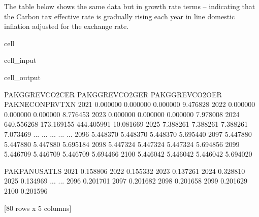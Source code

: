 \documentclass[letterpaper,10pt,english]{jupyterBook}
\begin{document}
\sphinxAtStartPar
The table below shows the same data but in growth rate terms – indicating that the Carbon tax effective rate is gradually rising each year in line domestic inflation adjusted for the exchange rate.

\begin{sphinxuseclass}{cell}\begin{sphinxVerbatimInput}

\begin{sphinxuseclass}{cell_input}
\begin{sphinxVerbatim}[commandchars=\\\{\}]
\PYG{p}{[}\PYG{p}{]}
\end{sphinxVerbatim}

\end{sphinxuseclass}\end{sphinxVerbatimInput}
\begin{sphinxVerbatimOutput}

\begin{sphinxuseclass}{cell_output}
\begin{sphinxVerbatim}[commandchars=\\\{\}]
      PAKGGREVCO2CER  PAKGGREVCO2GER  PAKGGREVCO2OER  PAKNECONPRVTXN   
2021        0.000000        0.000000        0.000000        9.476828  \PYGZbs{}
2022        0.000000        0.000000        0.000000        8.776453   
2023        0.000000        0.000000        0.000000        7.978008   
2024     \PYGZhy{}640.556268     \PYGZhy{}173.169155     \PYGZhy{}444.405991       10.081669   
2025        7.388261        7.388261        7.388261        7.073469   
...              ...             ...             ...             ...   
2096        5.448370        5.448370        5.448370        5.695440   
2097        5.447880        5.447880        5.447880        5.695184   
2098        5.447324        5.447324        5.447324        5.694856   
2099        5.446709        5.446709        5.446709        5.694466   
2100        5.446042        5.446042        5.446042        5.694020   

      PAKPANUSATLS  
2021     \PYGZhy{}0.158806  
2022     \PYGZhy{}0.155332  
2023     \PYGZhy{}0.137261  
2024     \PYGZhy{}0.328810  
2025     \PYGZhy{}0.134969  
...            ...  
2096     \PYGZhy{}0.201701  
2097     \PYGZhy{}0.201682  
2098     \PYGZhy{}0.201658  
2099     \PYGZhy{}0.201629  
2100     \PYGZhy{}0.201596  

[80 rows x 5 columns]
\end{sphinxVerbatim}

\end{sphinxuseclass}\end{sphinxVerbatimOutput}

\end{sphinxuseclass}
\end{document}
